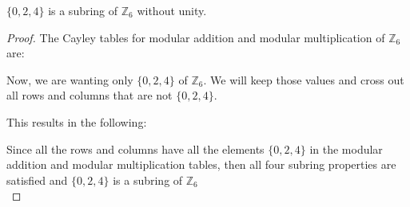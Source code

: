 \begin{example}{}
$\{0,2,4\}$ is a subring of ${\mathbb Z}_6$ without unity.\\

\begin{proof}
The Cayley tables for modular addition and modular multiplication of ${\mathbb Z}_6$ are:\\

\begin{figure}[H]
\end{figure}

Now, we are wanting only $\{0,2,4\}$ of ${\mathbb Z}_6$. We will keep those values and cross out all rows and columns that are not $\{0,2,4\}$. \\

\begin{figure}[H]
\end{figure}

This results in the following:

\begin{figure}[H]
\end{figure}

Since all the rows and columns have all the elements $\{0,2,4\}$ in the modular addition and modular multiplication tables, then all four subring properties are satisfied and  $\{0,2,4\}$ is a subring of ${\mathbb Z}_6$\\
\end{proof}
\end{example}


